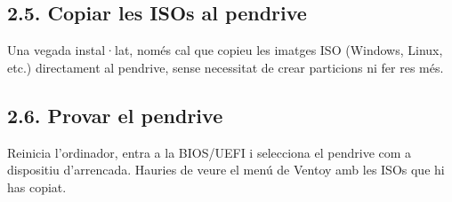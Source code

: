 \documentclass[
  12 pt,
  a4paper,
]{article}
\begin{document}
\subsection{2.5. Copiar les ISOs al
pendrive}\label{copiar-les-isos-al-pendrive}

Una vegada instal·lat, només cal que copieu les imatges ISO (Windows,
Linux, etc.) directament al pendrive, sense necessitat de crear
particions ni fer res més.

\subsection{2.6. Provar el pendrive}\label{provar-el-pendrive}

Reinicia l'ordinador, entra a la BIOS/UEFI i selecciona el pendrive com
a dispositiu d'arrencada. Hauries de veure el menú de Ventoy amb les
ISOs que hi has copiat.
\end{document}

